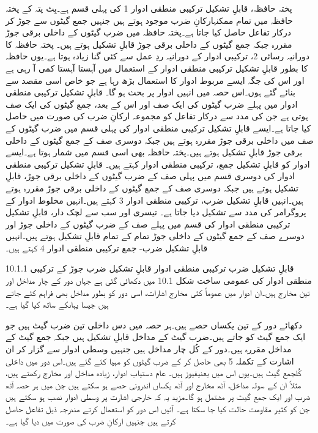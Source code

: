 	پختہ حافظہ، قابلِ تشکیل ترکیبی منطقی ادوار 1 کی پہلی قسم ہے۔بِٹ پتہ کے پختہ حافظہ میں تمام ممکنہارکانِ ضرب موجود ہوتے ہیں جنہیں جمع گیٹوں سے جوڑ کر درکار تفاعل حاصل کیا جاتا ہے۔پختہ حافظہ میں ضرب گیٹوں کے داخلی  برقی جوڑ مقررہ جبکہ جمع گیٹوں کے داخلی برقی جوڑ قابلِ تشکیل ہوتے ہیں۔
	پختہ حافظہ کا دورانیہ رسائی 2، ترکیبی ادوار کے دورانیہ ردِ عمل سے کئی گنا زیادہ ہوتا ہے۔یوں حافظہ کا بطور قابلِ تشکیل ترکیبی منطقی ادوار کے استعمال میں آہستا آہستا کمی آ رہی ہے اور اس کی جگہ ایسے مربوط ادوار کا استعمال بڑھ رہا ہے جو خاص اسی مقصد سے بنائے گئے ہوں۔اس حصہ میں انہیں ادوار پر بحث ہو گا۔
	قابلِ تشکیل ترکیبی منطقی ادوار میں پہلے ضرب گیٹوں کی ایک صف اور اس کے بعد، جمع گیٹوں کی ایک صف ہوتی ہے جن کی مدد سے درکار تفاعل کو مجموعہ ارکانِ ضرب کی صورت میں حاصل کیا جاتا ہے۔ایسے قابلِ تشکیل ترکیبی منطقی ادوار کی پہلی قسم میں ضرب گیٹوں کے صف میں داخلی برقی جوڑ مقررہ ہوتے ہیں جبکہ دوسری صف کے جمع گیٹوں کے داخلی برقی جوڑ قابلِ تشکیل ہوتے ہیں۔پختہ حافظہ بھی اسی قسم میں شمار ہوتا ہے۔ایسے ادوار کو قابلِ تشکیل جمع، ترکیبی منطقی ادوار کہتے ہیں۔ 
	قابلِ تشکیل ترکیبی منطقی ادوار کی دوسری قسم میں پہلی صف کے ضرب گیٹوں کے داخلی برقی جوڑ، قابلِ تشکیل ہوتے ہیں جبکہ  دوسری صف کے جمع گیٹوں کے داخلی برقی جوڑ مقررہ ہوتے ہیں۔انہیں قابلِ تشکیل ضرب، ترکیبی منطقی ادوار 3 کہتے ہیں۔انہیں مخلوط ادوار کے پروگرامر کی مدد سے تشکیل دیا جاتا  ہے۔
	تیسری اور سب سے لچک دار، قابلِ تشکیل ترکیبی منطقی ادوار کی قسم میں پہلے صف کے ضرب گیٹوں کے داخلی جوڑ اور دوسرے صف کے جمع گیٹوں کے داخلی جوڑ تمام کے تمام قابلِ تشکیل ہوتے ہیں۔انہیں  قابلِ تشکیل ضرب- جمع ترکیبی منطقی ادوار 4 کہتے ہیں۔

10.1.1 قابلِ تشکیل ضرب ترکیبی منطقی ادوار
	قابلِ تشکیل ضرب جوڑ کے ترکیبی منطقی ادوار کی عمومی ساخت شکل 10.1 میں دکھائی گئی ہے جہاں دور کے چار مداخل اور تین مخارج ہیں۔ان ادوار میں عموماً کئی مخارج اشارات، اسی دور کو بطور مداخل بھی فراہم کئے جاتے ہیں جیسا یہاںکے ساتھ کیا گیا ہے۔


	دکھائے دور کے تین یکساں حصے ہیں۔ہر حصہ میں دس داخلی تین ضرب گیٹ ہیں جو ایک جمع گیٹ کو جاتے ہیں۔ضرب گیٹ کے مداخل قابلِ تشکیل ہیں جبکہ جمع گیٹ کے مداخل مقررہ ہیں۔دور کے کُل چار مداخل ہیں جنہیں وسطی ادوار سے گزار کر ان اشارت کے تکملہ 5 بھی حاصل کر کے ضرب گیٹوں کو مہیا کئے گئے ہیں۔اس دور میں داخلی کُلجمع گیٹ ہیں۔یوں اس میں یعنیفیوز ہیں۔
	عام دستیاب ادوار، زیادہ مداخل اور مخارج رکھتے ہیں، مثلاً ان کے سولہ مداخل، آٹھ مخارج اور آٹھ یکساں اندرونی حصے ہو سکتے ہیں جن میں ہر حصہ آٹھ ضرب اور ایک جمع گیٹ پر مشتمل ہو گا۔مزید یہ کہ خارجی اشارت پر وسطی ادوار نصب ہو سکتے ہیں جن کو کثیر مقاومت حالت کیا جا سکتا ہے۔
	آئیں اس دور کو استعمال کرتے مندرجہ ذیل تفاعل حاصل کرتے ہیں جنہیں ارکانِ ضرب کی صورت میں دیا گیا ہے۔

